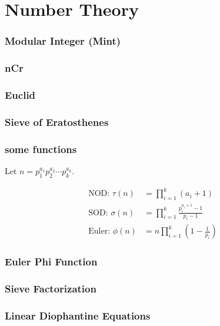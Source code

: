 \chapter{Number Theory}

\subsection{Modular Integer (Mint)}

\subsection{nCr}

\subsection{Euclid}

\subsection{Sieve of Eratosthenes}

\subsection{some functions}
Let $n = p_1^{a_1} p_2^{a_2} \cdots p_k^{a_k}$.

\[
\begin{aligned}
\text{NOD: } \tau(n) &= \prod_{i=1}^k (a_i + 1) \\
\text{SOD: } \sigma(n) &= \prod_{i=1}^k \frac{p_i^{a_i+1} - 1}{p_i - 1} \\
\text{Euler: } \phi(n) &= n \prod_{i=1}^k \left(1 - \frac{1}{p_i}\right)
\end{aligned}
\]


\subsection{Euler Phi Function}

\subsection{Sieve Factorization}

\subsection{Linear Diophantine Equations}

